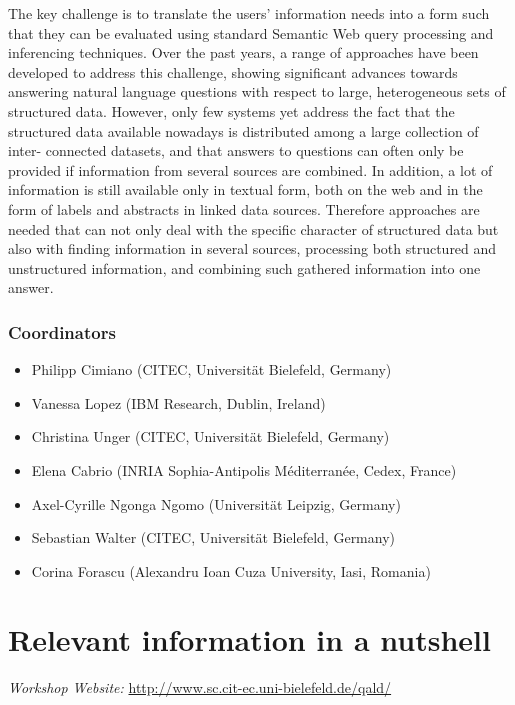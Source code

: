 \documentclass[a4paper]{article}
\begin{document}
{The key challenge is to translate the users' information needs into a form such that they can be evaluated using standard Semantic Web query processing and inferencing techniques. Over the past years, a range of approaches have been developed to address this challenge, showing significant advances towards answering natural language questions with respect to large, heterogeneous sets of structured data. However, only few systems yet address the fact that the structured data available nowadays is distributed among a large collection of inter- connected datasets, and that answers to questions can often only be provided if information from several sources are combined. In addition, a lot of information is still available only in textual form, both on the web and in the form of labels and abstracts in linked data sources. Therefore approaches are needed that can not only deal with the specific character of structured data but also with finding information in several sources, processing both structured and unstructured information, and combining such gathered information into one answer.

\subsubsection*{Coordinators} 

\begin{itemize}
\item Philipp Cimiano (CITEC, Universit\"at Bielefeld, Germany)
\item Vanessa Lopez (IBM Research, Dublin, Ireland)
\item Christina Unger (CITEC, Universit\"at Bielefeld, Germany)
\item Elena Cabrio (INRIA Sophia-Antipolis M\'editerran\'ee, Cedex, France)
\item Axel-Cyrille Ngonga Ngomo (Universit\"at Leipzig, Germany)
\item Sebastian Walter (CITEC, Universit\"at Bielefeld, Germany)
\item Corina Forascu (Alexandru Ioan Cuza University, Iasi, Romania)
\end{itemize}

\newpage

\section{Relevant information in a nutshell}

{\em Workshop Website:} \url{http://www.sc.cit-ec.uni-bielefeld.de/qald/}

}
\end{document}
